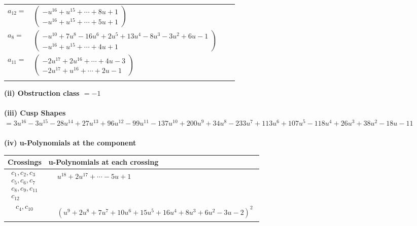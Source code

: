 \documentclass[1p]{elsarticle_modified}
\theoremstyle{definition}
\begin{document}
\begin{tabular}{m{7pt} m{180pt} m{7pt} m{180pt} }
\flushright $a_{12}=$&$\begin{pmatrix}- u^{16}+u^{15}+\cdots+8 u+1\\- u^{16}+u^{15}+\cdots+5 u+1\end{pmatrix}$ \\
\flushright $a_{8}=$&$\begin{pmatrix}- u^{10}+7 u^8-16 u^6+2 u^5+13 u^4-8 u^3-3 u^2+6 u-1\\- u^{16}+u^{15}+\cdots+4 u+1\end{pmatrix}$ \\
\flushright $a_{11}=$&$\begin{pmatrix}-2 u^{17}+2 u^{16}+\cdots+4 u-3\\-2 u^{17}+u^{16}+\cdots+2 u-1\end{pmatrix}$\\&\end{tabular}
\flushleft \textbf{(ii) Obstruction class $= -1$}\\~\\
\flushleft \textbf{(iii) Cusp Shapes $= 3 u^{16}-3 u^{15}-28 u^{14}+27 u^{13}+96 u^{12}-99 u^{11}-137 u^{10}+200 u^9+34 u^8-233 u^7+113 u^6+107 u^5-118 u^4+26 u^3+38 u^2-18 u-11$}\\~\\
\newpage\renewcommand{\arraystretch}{1}
\flushleft \textbf{(iv) u-Polynomials at the component}\newline \\
\begin{tabular}{m{50pt}|m{274pt}}
Crossings & \hspace{64pt}u-Polynomials at each crossing \\
\hline $$\begin{aligned}c_{1},c_{2},c_{3}\\c_{5},c_{6},c_{7}\\c_{8},c_{9},c_{11}\\c_{12}\end{aligned}$$&$\begin{aligned}
&u^{18}+2 u^{17}+\cdots-5 u+1
\end{aligned}$\\
\hline $$\begin{aligned}c_{4},c_{10}\end{aligned}$$&$\begin{aligned}
&(u^9+2 u^8+7 u^7+10 u^6+15 u^5+16 u^4+8 u^3+6 u^2-3 u-2)^2
\end{aligned}$\\
\hline
\end{tabular}\\~\\
\end{document}

